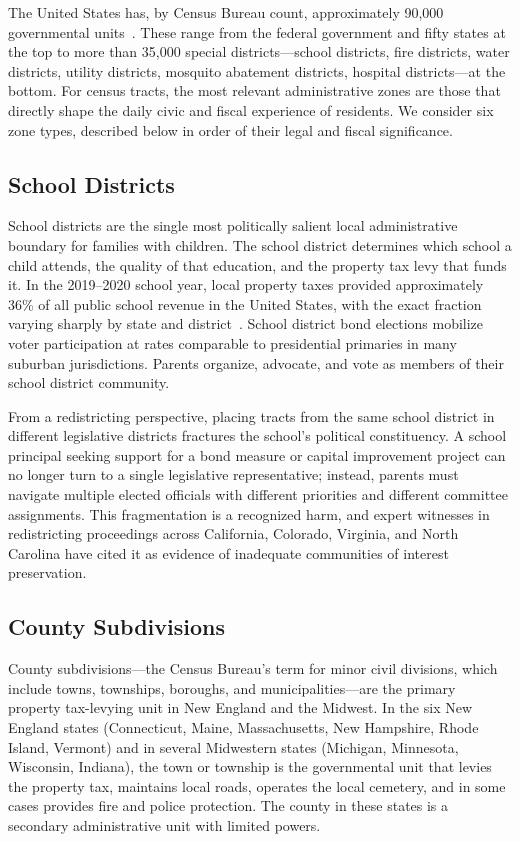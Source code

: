 \label{sec:zones-as-community}

The United States has, by Census Bureau count, approximately 90,000 governmental
units~\citep{census2017govts}.
These range from the federal government and fifty states at the top to more than
35,000 special districts---school districts, fire districts, water districts, utility
districts, mosquito abatement districts, hospital districts---at the bottom.
For census tracts, the most relevant administrative zones are those that directly
shape the daily civic and fiscal experience of residents.
We consider six zone types, described below in order of their legal and fiscal
significance.

\subsection{School Districts}

School districts are the single most politically salient local administrative boundary
for families with children.
The school district determines which school a child attends, the quality of that
education, and the property tax levy that funds it.
In the 2019--2020 school year, local property taxes provided approximately 36\% of
all public school revenue in the United States, with the exact fraction varying
sharply by state and district~\citep{nces2022}.
School district bond elections mobilize voter participation at rates comparable to
presidential primaries in many suburban jurisdictions.
Parents organize, advocate, and vote as members of their school district community.

From a redistricting perspective, placing tracts from the same school district in
different legislative districts fractures the school's political constituency.
A school principal seeking support for a bond measure or capital improvement project
can no longer turn to a single legislative representative; instead, parents must
navigate multiple elected officials with different priorities and different committee
assignments.
This fragmentation is a recognized harm, and expert witnesses in redistricting
proceedings across California, Colorado, Virginia, and North Carolina have cited
it as evidence of inadequate communities of interest preservation.

\subsection{County Subdivisions}

County subdivisions---the Census Bureau's term for minor civil divisions, which include
towns, townships, boroughs, and municipalities---are the primary property tax-levying
unit in New England and the Midwest.
In the six New England states (Connecticut, Maine, Massachusetts, New Hampshire,
Rhode Island, Vermont) and in several Midwestern states (Michigan, Minnesota, Wisconsin,
Indiana), the town or township is the governmental unit that levies the property tax,
maintains local roads, operates the local cemetery, and in some cases provides fire
and police protection.
The county in these states is a secondary administrative unit with limited powers.

